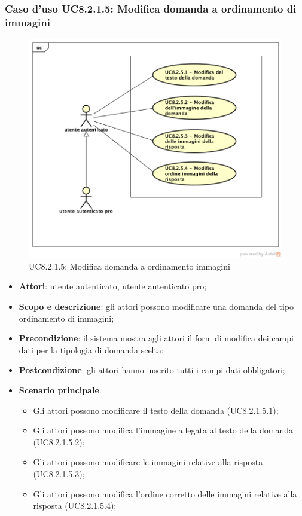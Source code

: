 \subsubsection{Caso d’uso UC8.2.1.5: Modifica domanda a ordinamento di immagini}
\label{UC8.2.1.5}
	\begin{figure}[h]
		\centering
			\includegraphics[scale=0.45,keepaspectratio]{UML/UC8_2_1_5.png}
		\caption{UC8.2.1.5: Modifica domanda a ordinamento immagini}
	\end{figure}
\begin{itemize}
	\item\textbf{Attori}: utente autenticato, utente autenticato pro;
	\item\textbf{Scopo e descrizione}: gli attori possono modificare una domanda del tipo ordinamento di immagini;
	\item\textbf{Precondizione}: il sistema mostra agli attori il form di modifica dei campi dati per la tipologia di domanda scelta; 
	\item \textbf{Postcondizione}: gli attori hanno inserito tutti i campi dati obbligatori;
	\item\textbf{Scenario principale}: 
	\begin{itemize}
		\item Gli attori possono modificare il testo della domanda (UC8.2.1.5.1);
		\item Gli attori possono modifica l'immagine allegata al testo della domanda (UC8.2.1.5.2);
		\item Gli attori possono modificare le immagini relative alla risposta (UC8.2.1.5.3);
		\item Gli attori possono modifica l'ordine corretto delle immagini relative alla risposta (UC8.2.1.5.4);
	\end{itemize}
\end{itemize}

